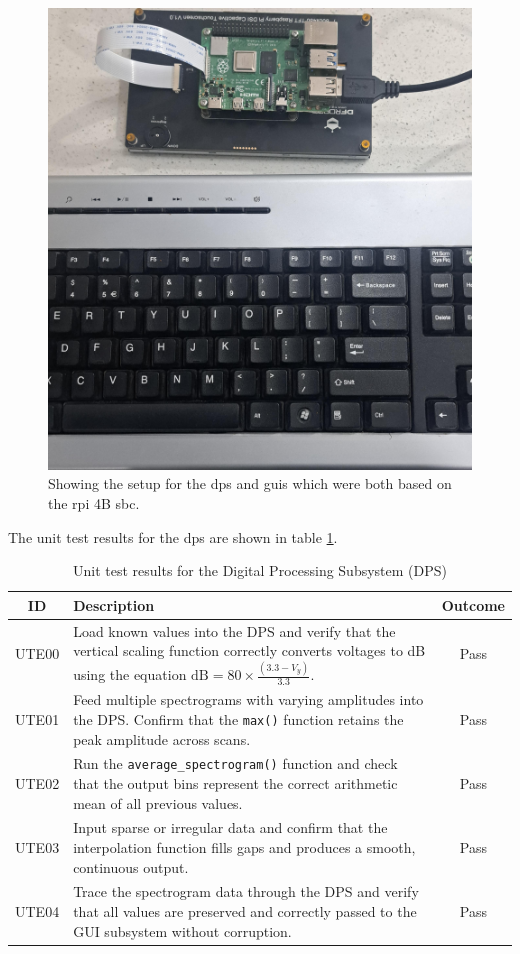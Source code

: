 \documentclass[class=report,11pt,crop=false]{standalone}
\begin{document}
	\begin{figure}[ht!]
		\centering
		\includegraphics[width=0.35\linewidth]{Figures/Results/rpi-setup}
		\caption{Showing the setup for the \acrshort{dps} and \acrshort{guis} which were both based on the \acrshort{rpi} 4B \acrshort{sbc}.}
		\label{fig:rpi-4b-guis}
	\end{figure} 

	The unit test results for the \acrshort{dps} are shown in table \ref{tab:dps-unit-tests}.
	
	\begin{table}[ht!]
		\centering
		\begin{tabular}{|c|m{25em}|c|}
			\hline
			\textbf{ID} & \textbf{Description} & \textbf{Outcome} \\
			\hline
			UTE00 & Load known values into the DPS and verify that the vertical scaling function correctly converts voltages to dB using the equation $\text{dB} = 80 \times \frac{(3.3 - V_y)}{3.3}$. & Pass \\
			\hline
			UTE01 & Feed multiple spectrograms with varying amplitudes into the DPS. Confirm that the \texttt{max()} function retains the peak amplitude across scans. & Pass \\
			\hline
			UTE02 & Run the \texttt{average\_spectrogram()} function and check that the output bins represent the correct arithmetic mean of all previous values. & Pass \\
			\hline
			UTE03 & Input sparse or irregular data and confirm that the interpolation function fills gaps and produces a smooth, continuous output. & Pass \\
			\hline
			UTE04 & Trace the spectrogram data through the DPS and verify that all values are preserved and correctly passed to the GUI subsystem without corruption. & Pass \\
			\hline
		\end{tabular}
		\caption{Unit test results for the Digital Processing Subsystem (DPS)}
		\label{tab:dps-unit-tests}
	\end{table}
\end{document}
